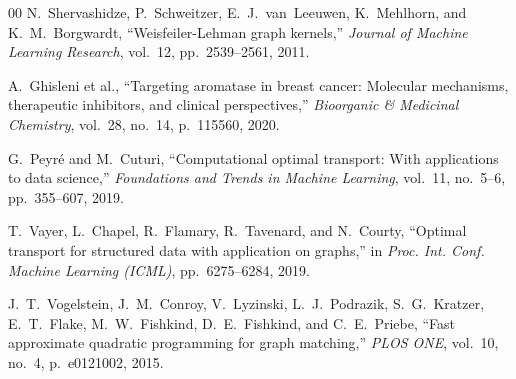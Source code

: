 \documentclass[conference]{IEEEtran}
\begin{document}
\begin{thebibliography}{00}
N.~Shervashidze, P.~Schweitzer, E.~J.~van~Leeuwen, K.~Mehlhorn, and K.~M.~Borgwardt,
``Weisfeiler-Lehman graph kernels,''
\textit{Journal of Machine Learning Research},
vol.~12, pp.~2539--2561, 2011.

A.~Ghisleni et al.,
``Targeting aromatase in breast cancer: Molecular mechanisms, therapeutic inhibitors, and clinical perspectives,''
\textit{Bioorganic \& Medicinal Chemistry},
vol.~28, no.~14, p.~115560, 2020.

G.~Peyr{\'e} and M.~Cuturi,
``Computational optimal transport: With applications to data science,''
\textit{Foundations and Trends in Machine Learning},
vol.~11, no.~5--6, pp.~355--607, 2019.

T.~Vayer, L.~Chapel, R.~Flamary, R.~Tavenard, and N.~Courty,
``Optimal transport for structured data with application on graphs,''
in \textit{Proc. Int. Conf. Machine Learning (ICML)},
pp.~6275--6284, 2019.

J.~T.~Vogelstein, J.~M.~Conroy, V.~Lyzinski, L.~J.~Podrazik, S.~G.~Kratzer, E.~T.~Flake, M.~W.~Fishkind, D.~E.~Fishkind, and C.~E.~Priebe,
``Fast approximate quadratic programming for graph matching,''
\textit{PLOS ONE},
vol.~10, no.~4, p.~e0121002, 2015.

\end{thebibliography}
\end{document}
